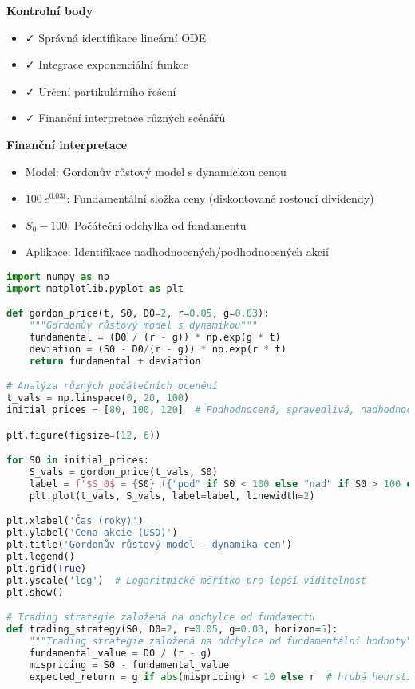 \begin{example}
\noindent\textbf{Kontrolní body}
\begin{itemize}
\item ✓ Správná identifikace lineární ODE
\item ✓ Integrace exponenciální funkce
\item ✓ Určení partikulárního řešení
\item ✓ Finanční interpretace různých scénářů
\end{itemize}

\noindent\textbf{Finanční interpretace}
\begin{itemize}
\item Model: Gordonův růstový model s dynamickou cenou
\item $100\, e^{0.03t}$: Fundamentální složka ceny (diskontované rostoucí dividendy)
\item $S_0 - 100$: Počáteční odchylka od fundamentu
\item Aplikace: Identifikace nadhodnocených/podhodnocených akcií
\end{itemize}

\begin{lstlisting}[language=Python, caption={Implementace Gordonova modelu v Pythonu}, label={lst:gordon}]
import numpy as np
import matplotlib.pyplot as plt

def gordon_price(t, S0, D0=2, r=0.05, g=0.03):
    """Gordonův růstový model s dynamikou"""
    fundamental = (D0 / (r - g)) * np.exp(g * t)
    deviation = (S0 - D0/(r - g)) * np.exp(r * t)
    return fundamental + deviation

# Analýza různých počátečních ocenění
t_vals = np.linspace(0, 20, 100)
initial_prices = [80, 100, 120]  # Podhodnocená, spravedlivá, nadhodnocená

plt.figure(figsize=(12, 6))

for S0 in initial_prices:
    S_vals = gordon_price(t_vals, S0)
    label = f'$S_0$ = {S0} ({"pod" if S0 < 100 else "nad" if S0 > 100 else "spravedlivá"})'
    plt.plot(t_vals, S_vals, label=label, linewidth=2)

plt.xlabel('Čas (roky)')
plt.ylabel('Cena akcie (USD)')
plt.title('Gordonův růstový model - dynamika cen')
plt.legend()
plt.grid(True)
plt.yscale('log')  # Logaritmické měřítko pro lepší viditelnost
plt.show()

# Trading strategie založená na odchylce od fundamentu
def trading_strategy(S0, D0=2, r=0.05, g=0.03, horizon=5):
    """Trading strategie založená na odchylce od fundamentální hodnoty"""
    fundamental_value = D0 / (r - g)
    mispricing = S0 - fundamental_value
    expected_return = g if abs(mispricing) < 10 else r  # hrubá heurstika
    

\end{lstlisting}
\end{example}
